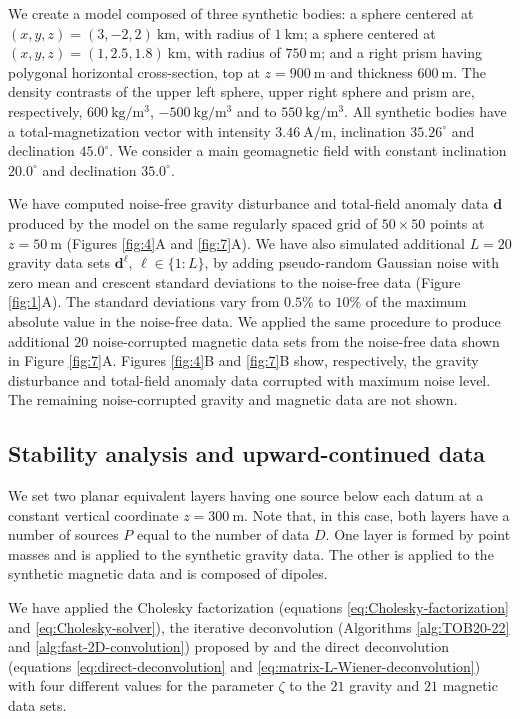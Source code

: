 We create a model composed of three synthetic bodies:
a sphere centered at $(x, y, z) = (3, -2, 2) \: \mathrm{km}$, with radius of $1 \: \mathrm{km}$;
a sphere centered at $(x, y, z) = (1, 2.5, 1.8) \: \mathrm{km}$, with radius of $750 \: \mathrm{m}$; and
a right prism having polygonal horizontal cross-section, top at $z = 900 \: \mathrm{m}$ and thickness $600 \: \mathrm{m}$.
The density contrasts of the upper left sphere, upper right sphere and prism are, respectively, 
$600 \: \mathrm{kg}/\mathrm{m}^{3}$, $-500 \: \mathrm{kg}/\mathrm{m}^{3}$ and to $550 \: \mathrm{kg}/\mathrm{m}^{3}$. 
All synthetic bodies have a total-magnetization vector with intensity $3.46 \: \mathrm{A}/\mathrm{m}$, inclination $35.26^{\circ}$
and declination $45.0^{\circ}$.
We consider a main geomagnetic field with constant inclination $20.0^{\circ}$ and declination $35.0^{\circ}$.

We have computed noise-free gravity disturbance and total-field anomaly data $\mathbf{d}$ produced by the
model on the same regularly spaced grid of $50 \times 50$ points at $z = 50 \: \mathrm{m}$
(Figures \ref{fig:4}A and \ref{fig:7}A).
We have also simulated additional $L = 20$ gravity data sets $\mathbf{d}^{\ell}$, $\ell \in \{1:L\}$, 
by adding pseudo-random Gaussian noise 
with zero mean and crescent standard deviations to the noise-free data (Figure \ref{fig:1}A).
The standard deviations vary from $0.5\%$ to $10\%$ of the maximum absolute value in the noise-free data.
We applied the same procedure to produce additional $20$ noise-corrupted magnetic data sets from the
noise-free data shown in Figure \ref{fig:7}A.
Figures \ref{fig:4}B and \ref{fig:7}B show, respectively, the gravity disturbance and total-field anomaly data 
corrupted with maximum noise level.
The remaining noise-corrupted gravity and magnetic data are not shown.

\subsection{Stability analysis and upward-continued data}

We set two planar equivalent layers having one source below each datum at a constant vertical coordinate $z = 300 \: \mathrm{m}$.
Note that, in this case, both layers have a number of sources $P$ equal to the number of data $D$.
One layer is formed by point masses and is applied to the synthetic gravity data.
The other is applied to the synthetic magnetic data and is composed of dipoles.

We have applied the Cholesky factorization (equations \ref{eq:Cholesky-factorization} and \ref{eq:Cholesky-solver}), 
the iterative deconvolution (Algorithms \ref{alg:TOB20-22} and \ref{alg:fast-2D-convolution}) proposed by 
\citet{takahashi-etal2020, takahashi-etal2022} and the direct deconvolution (equations \ref{eq:direct-deconvolution} and \ref{eq:matrix-L-Wiener-deconvolution})
with four different values for the parameter $\zeta$ to the $21$ gravity and $21$ magnetic data sets.

